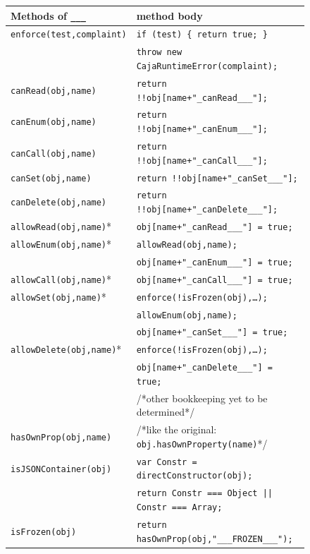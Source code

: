 \documentclass[letterpaper,twocolumn,10pt]{article}
\newcommand{\code}[1]{{\tt {#1}}}              %
\begin{document}
\begin{figure}
\begin{tabular}{ll}
  Methods of \code{\_\_\_}  & method body \\ 
  \hline 
  \code{enforce(test,complaint)}
       & \code{if (test)\ \{ return true; \}} \\
       & \code{throw new CajaRuntimeError(complaint);} \\
  \hline
  \code{canRead(obj,name)}  
       & \code{return !!obj[name+"\_canRead\_\_\_"];} \\
  \code{canEnum(obj,name)}
       & \code{return !!obj[name+"\_canEnum\_\_\_"];} \\
  \code{canCall(obj,name)}
       & \code{return !!obj[name+"\_canCall\_\_\_"];} \\
  \code{canSet(obj,name)}
       & \code{return !!obj[name+"\_canSet\_\_\_"];} \\
  \code{canDelete(obj,name)}
       & \code{return !!obj[name+"\_canDelete\_\_\_"];} \\
  \hline
  \code{allowRead(obj,name)}* 
       & \code{obj[name+"\_canRead\_\_\_"] = true;} \\
  \code{allowEnum(obj,name)}* 
       & \code{allowRead(obj,name);} \\
       & \code{obj[name+"\_canEnum\_\_\_"] = true;} \\
  \code{allowCall(obj,name)}* 
       & \code{obj[name+"\_canCall\_\_\_"] = true;} \\
  \code{allowSet(obj,name)}* 
       & \code{enforce(!isFrozen(obj),\ldots);} \\
       & \code{allowEnum(obj,name);} \\
       & \code{obj[name+"\_canSet\_\_\_"] = true;}\\
  \code{allowDelete(obj,name)}* 
       & \code{enforce(!isFrozen(obj),\ldots);} \\
       & \code{obj[name+"\_canDelete\_\_\_"] = true;} \\
       & /*other bookkeeping yet to be determined*/ \\
  \hline 
  \code{hasOwnProp(obj,name)} 
       & /*like the original: \code{obj.hasOwnProperty(name)}*/ \\
  \code{isJSONContainer(obj)} 
       & \code{var Constr = directConstructor(obj);} \\
       & \code{return Constr === Object || Constr === Array;} \\ 
  \code{isFrozen(obj)} 
       & \code{return hasOwnProp(obj,"\_\_\_FROZEN\_\_\_");} \\

\end{tabular}
\end{figure}
\end{document}
